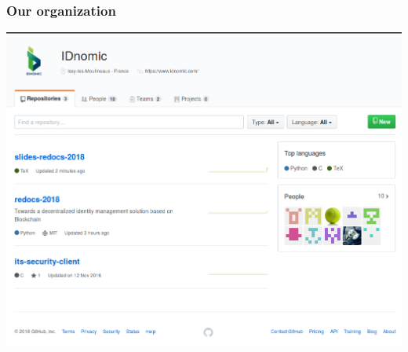 \begin{frame}
	\frametitle{Our organization}
	\includegraphics[scale=0.4]{figs/github.png}
\end{frame}